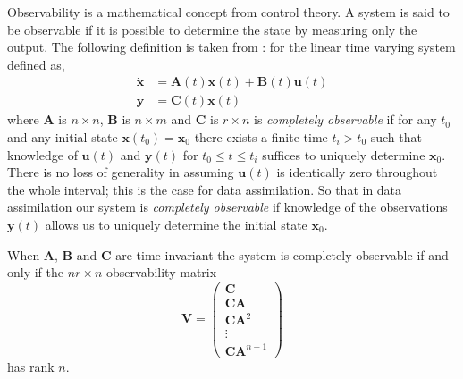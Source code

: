 Observability is a mathematical concept from control theory. A system is said to be observable if it is possible to determine the state by measuring only the output. The following definition is taken from \citet{barnett1985introduction}: for the linear time varying system defined as,
\begin{align}
\dot{\textbf{x}} &= \textbf{A}(t)\textbf{x}(t) +\textbf{B}(t)\textbf{u}(t) \\
\textbf{y} &= \textbf{C}(t)\textbf{x}(t)
\end{align}
where $\textbf{A}$ is $n \times n$, $\textbf{B}$ is $n \times m$ and $\textbf{C}$ is $r \times n$ is \textit{completely observable} if for any $t_0$ and any initial state $\textbf{x}(t_0) = \textbf{x}_0$ there exists a finite time $t_i > t_0$ such that knowledge of $\textbf{u}(t)$ and $\textbf{y}(t)$ for $t_0 \leq t \leq t_i$ suffices to uniquely determine $\textbf{x}_0$. There is no loss of generality in assuming $\textbf{u}(t)$ is identically zero throughout the whole interval; this is the case for data assimilation. So that in data assimilation our system is \textit{completely observable} if knowledge of the observations $\textbf{y}(t)$ allows us to uniquely determine the initial state $\textbf{x}_0$.

\begin{theorem} \label{chap5:thm:observable}
When $\textbf{A}$, $\textbf{B}$ and $\textbf{C}$ are time-invariant the system is completely observable if and only if the $nr \times n$ observability matrix
\begin{equation}
\mathbf{V}=
\begin{pmatrix}
\mathbf{C} \\
\mathbf{C}\mathbf{A}\\
\mathbf{C}\mathbf{A}^{2}\\
\vdots \\
\mathbf{C}\mathbf{A}^{n-1}
\end{pmatrix}
\end{equation}
has rank $n$.
\end{theorem}

